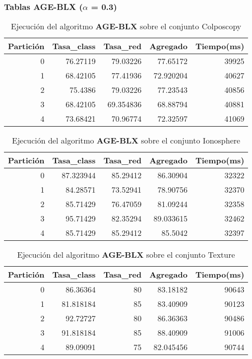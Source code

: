 \documentclass[size=a4, parskip=half, titlepage=false, toc=flat, toc=bib, 12pt]{scrartcl}
\begin{document}
\newpage

\subsubsection{Tablas AGE-BLX ($\alpha$ = 0.3)}

 \begin{table}[ht]
  \centering
  \begin{tabular}[t]{rrrrr}
  \toprule
  Partición &Tasa\_class &Tasa\_red & Agregado & Tiempo(ms)\\
  \midrule
0         & 76.27119  & 79.03226  & 77.65172  & 39925  \\
1         & 68.42105  & 77.41936  & 72.920204 & 40627  \\
2         & 75.4386   & 79.03226  & 77.23543  & 40856  \\
3         & 68.42105  & 69.354836 & 68.88794  & 40881  \\
4         & 73.68421  & 70.96774  & 72.32597  & 41069  \\
  \bottomrule
  \end{tabular}
  \caption{Ejecución del algoritmo \textbf{AGE-BLX} sobre el conjunto Colposcopy }
  \end{table}%

 \begin{table}[ht]
  \centering
  \begin{tabular}[t]{rrrrr}
  \toprule
  Partición &Tasa\_class &Tasa\_red & Agregado & Tiempo(ms)\\
  \midrule
0         & 87.323944 & 85.29412 & 86.30904  & 32322  \\
1         & 84.28571  & 73.52941 & 78.90756  & 32370  \\
2         & 85.71429  & 76.47059 & 81.09244  & 32358  \\
3         & 95.71429  & 82.35294 & 89.033615 & 32462  \\
4         & 85.71429  & 85.29412 & 85.5042   & 32397  \\
  \bottomrule
  \end{tabular}
  \caption{Ejecución del algoritmo \textbf{AGE-BLX} sobre el conjunto Ionosphere}
  \end{table}%

 \begin{table}[ht]
  \centering
  \begin{tabular}[t]{rrrrr}
  \toprule
  Partición &Tasa\_class &Tasa\_red & Agregado & Tiempo(ms)\\
  \midrule
0         & 86.36364  & 80       & 83.18182  & 90643  \\
1         & 81.818184 & 85       & 83.40909  & 90123  \\
2         & 92.72727  & 80       & 86.36363  & 90486  \\
3         & 91.818184 & 85       & 88.40909  & 91006  \\
4         & 89.09091  & 75       & 82.045456 & 90744  \\
\bottomrule
  \end{tabular}
  \caption{Ejecución del algoritmo \textbf{AGE-BLX} sobre el conjunto Texture}
  \end{table}%
\end{document}
